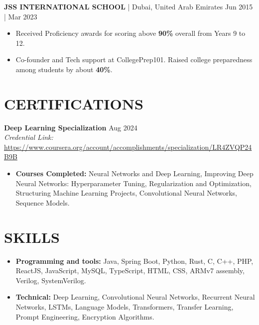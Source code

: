 \documentclass[a4paper,1.5pt]{extarticle}
\begin{document}
\noindent
\textbf{JSS INTERNATIONAL SCHOOL} | Dubai, United Arab Emirates \hfill Jun 2015 | Mar 2023
\begin{itemize}
    \item Received Proficiency awards for scoring above \textbf{90\%} overall from Years 9 to 12.
    \item Co-founder and Tech support at CollegePrep101. Raised college preparedness among students by about \textbf{40\%}.
\end{itemize}


\section*{CERTIFICATIONS}
\noindent
\textbf{Deep Learning Specialization} \hfill Aug 2024 \\
\textit{Credential Link:} \url{https://www.coursera.org/account/accomplishments/specialization/LR4ZVQP24B9B}
\begin{itemize}
    \item \textbf{Courses Completed:} Neural Networks and Deep Learning, Improving Deep Neural Networks: Hyperparameter Tuning, Regularization and Optimization, Structuring Machine Learning Projects, Convolutional Neural Networks, Sequence Models.
    
\end{itemize}
\section*{SKILLS}
\begin{itemize}
    \item \textbf{Programming and tools:} Java, Spring Boot, Python, Rust, C, C++, PHP, ReactJS, JavaScript, MySQL, TypeScript, HTML, CSS, ARMv7 assembly, Verilog, SystemVerilog.
    \item \textbf{Technical:} Deep Learning, Convolutional Neural Networks, Recurrent Neural Networks, LSTMs, Language Models, Transformers, Transfer Learning, Prompt Engineering, Encryption Algorithms. 
\end{itemize}

\end{document}
